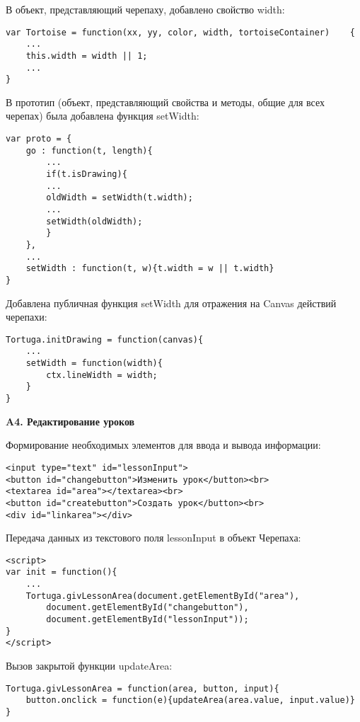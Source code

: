 В объект, представляющий черепаху, добавлено свойство width:
\begin{verbatim}
var Tortoise = function(xx, yy, color, width, tortoiseContainer)	{		
    ...
    this.width = width || 1;
    ...
}
\end{verbatim}
В прототип (объект, представляющий свойства и методы, общие для всех черепах) была добавлена функция setWidth:

\begin{verbatim}
var proto = {
    go : function(t, length){
        ...
        if(t.isDrawing){
        ...
        oldWidth = setWidth(t.width);
        ...
        setWidth(oldWidth);
        }
    },
    ...
    setWidth : function(t, w){t.width = w || t.width}
}
\end{verbatim}

Добавлена публичная функция setWidth для отражения на Canvas действий черепахи:

\begin{verbatim}
Tortuga.initDrawing = function(canvas){
    ...
    setWidth = function(width){
        ctx.lineWidth = width;
    }
}
\end{verbatim}

\vspace{16mm}
\textbf{\Large A4. Редактирование уроков}
\vspace{6mm}

Формирование необходимых элементов для ввода и вывода информации:
\begin{verbatim}
<input type="text" id="lessonInput">
<button id="changebutton">Изменить урок</button><br>
<textarea id="area"></textarea><br>
<button id="createbutton">Создать урок</button><br>
<div id="linkarea"></div>
\end{verbatim}

Передача данных из  текстового поля lessonInput в объект Черепаха:
\begin{verbatim}
<script>
var init = function(){
    ...
    Tortuga.givLessonArea(document.getElementById("area"),
        document.getElementById("changebutton"),
        document.getElementById("lessonInput"));
}
</script>
\end{verbatim}

Вызов закрытой функции updateArea:
\begin{verbatim}
Tortuga.givLessonArea = function(area, button, input){
    button.onclick = function(e){updateArea(area.value, input.value)}
}
\end{verbatim}

